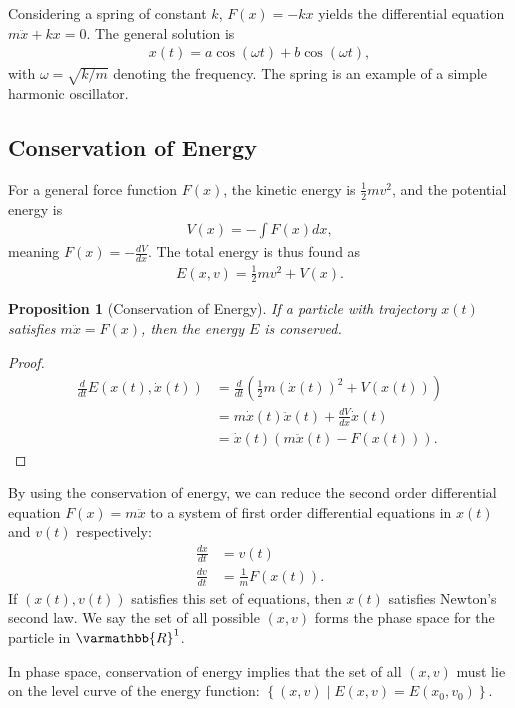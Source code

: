 \documentclass[12pt]{extarticle}
\newcommand{\R}{\varmathbb{R}}
\newcommand{\set}[1]{\left\{#1\right\}}
\theoremstyle{plain}
\newtheorem*{proposition}{Proposition}%
\theoremstyle{definition}
\theoremstyle{remark}
\renewcommand{\newline}{\hfill\break}
\begin{document}
  Considering a spring of constant $k$, $F(x) = -kx$ yields the differential equation $m\ddot{x} + kx = 0$. The general solution is
  \begin{align*}
    x(t) = a\cos(\omega t) + b\cos(\omega t),
  \end{align*}
  with $\omega = \sqrt{k/m}$ denoting the frequency. The spring is an example of a simple harmonic oscillator.
  \subsection{Conservation of Energy}%
  For a general force function $F(x)$, the kinetic energy is $\frac{1}{2}mv^2$, and the potential energy is
  \begin{align*}
    V(x) = -\int F(x)dx,
  \end{align*}
  meaning $F(x) = -\frac{dV}{dx}$. The total energy is thus found as
  \begin{align*}
    E(x,v) = \frac{1}{2}mv^2 + V(x).
  \end{align*}
  \begin{proposition}[Conservation of Energy]
  If a particle with trajectory $x(t)$ satisfies $m\ddot{x} = F(x)$, then the energy $E$ is conserved.
  \end{proposition}
  \begin{proof}
    \begin{align*}
      \frac{d}{dt}E(x(t),\dot{x}(t)) &= \frac{d}{dt}\left(\frac{1}{2}m(\dot{x}(t))^2 + V(x(t))\right)\\
                                     &= m\dot{x}(t)\ddot{x}(t) + \frac{dV}{dx}\dot{x}(t)\\
                                     &= \dot{x}(t)\left(m\ddot{x}(t) - F(x(t))\right).
    \end{align*}
  \end{proof}
  By using the conservation of energy, we can reduce the second order differential equation $F(x) = m\ddot{x}$ to a system of first order differential equations in $x(t)$ and $v(t)$ respectively:
  \begin{align*}
    \frac{dx}{dt} &= v(t)\\
    \frac{dv}{dt} &= \frac{1}{m}F(x(t)).
  \end{align*}
  If $(x(t),v(t))$ satisfies this set of equations, then $x(t)$ satisfies Newton's second law. We say the set of all possible $(x,v)$ forms the phase space for the particle in $\R^1$.\newline

  In phase space, conservation of energy implies that the set of all $(x,v)$ must lie on the level curve of the energy function: $\set{(x,v)\mid E(x,v) = E(x_0,v_0)}$.\newline
\end{document}
